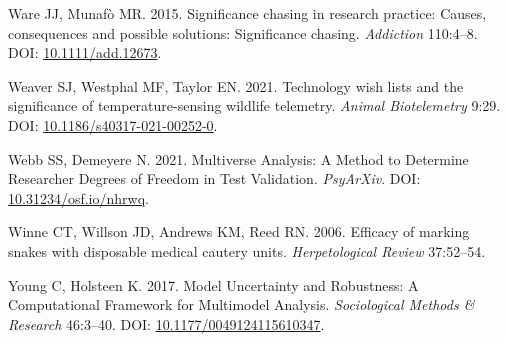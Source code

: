 \documentclass[10pt,a4paper]{article}
\newlength{\cslhangindent}
\newlength{\cslentryspacingunit} %
\newenvironment{CSLReferences}[2] %
 {%
  \setlength{\parindent}{0pt}
  \ifodd #1
  \let\oldpar\par
  \def\par{\hangindent=\cslhangindent\oldpar}
  \fi
  \setlength{\parskip}{#2\cslentryspacingunit}
 }%
 {}
\begin{document}
\begin{CSLReferences}{1}{0}
\leavevmode{}%
Ware JJ, Munafò MR. 2015. Significance chasing in research practice: Causes, consequences and possible solutions: {Significance} chasing. \emph{Addiction} 110:4--8. DOI: \href{https://doi.org/10.1111/add.12673}{10.1111/add.12673}.

\leavevmode{}%
Weaver SJ, Westphal MF, Taylor EN. 2021. Technology wish lists and the significance of temperature-sensing wildlife telemetry. \emph{Animal Biotelemetry} 9:29. DOI: \href{https://doi.org/10.1186/s40317-021-00252-0}{10.1186/s40317-021-00252-0}.

\leavevmode{}%
Webb SS, Demeyere N. 2021. Multiverse {Analysis}: {A} {Method} to {Determine} {Researcher} {Degrees} of {Freedom} in {Test} {Validation}. \emph{PsyArXiv}. DOI: \href{https://doi.org/10.31234/osf.io/nhrwq}{10.31234/osf.io/nhrwq}.

\leavevmode{}%
Winne CT, Willson JD, Andrews KM, Reed RN. 2006. Efficacy of marking snakes with disposable medical cautery units. \emph{Herpetological Review} 37:52--54.

\leavevmode{}%
Young C, Holsteen K. 2017. Model {Uncertainty} and {Robustness}: {A} {Computational} {Framework} for {Multimodel} {Analysis}. \emph{Sociological Methods \& Research} 46:3--40. DOI: \href{https://doi.org/10.1177/0049124115610347}{10.1177/0049124115610347}.

\end{CSLReferences}
\end{document}
